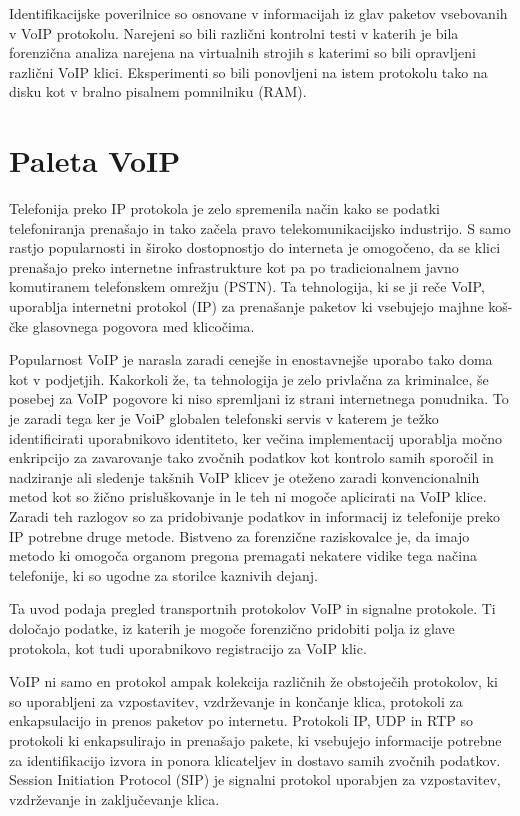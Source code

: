 \documentclass{acm_proc_article-sp}
\begin{document}
Identifikacijske poverilnice so osnovane v informacijah iz glav paketov vsebovanih v VoIP protokolu. Narejeni so bili različni kontrolni testi v katerih je bila forenzična analiza narejena na virtualnih strojih s katerimi so bili opravljeni različni VoIP klici. Eksperimenti so bili ponovljeni na istem protokolu tako na disku kot v bralno pisalnem pomnilniku (RAM).

\section{Paleta VoIP}
Telefonija preko IP protokola je zelo spremenila način kako se podatki telefoniranja prenašajo in tako začela pravo telekomunikacijsko industrijo. S samo rastjo popularnosti in široko dostopnostjo do interneta je omogočeno, da se klici prenašajo preko internetne infrastrukture kot pa po tradicionalnem javno komutiranem telefonskem omrežju (PSTN). Ta tehnologija, ki se ji reče VoIP, uporablja internetni protokol (IP) za prenašanje paketov ki vsebujejo majhne koš-čke glasovnega pogovora med klicočima.

Popularnost VoIP je narasla zaradi cenejše in enostavnejše uporabo tako doma kot v podjetjih\cite{ORIG}. Kakorkoli že, ta tehnologija je zelo privlačna za kriminalce, še posebej za VoIP pogovore ki niso spremljani iz strani internetnega ponudnika. To je zaradi tega ker je VoiP globalen telefonski servis v katerem je težko identificirati uporabnikovo identiteto, ker večina implementacij uporablja močno enkripcijo za zavaro\-vanje tako zvočnih podatkov kot kontrolo samih sporočil in nadziranje ali sledenje takšnih VoIP klicev je oteženo zaradi konvencionalnih metod kot so žično prisluškovanje in le teh ni mogoče aplicirati na VoIP klice. Zaradi teh razlogov so za pridobivanje podatkov in informacij iz telefonije preko IP potrebne druge metode. Bistveno za forenzične raziskovalce je, da imajo metodo ki omogoča organom pregona premagati nekatere vidike tega načina telefonije, ki so ugodne za storilce kaznivih dejanj.

Ta uvod podaja pregled transportnih protokolov VoIP in signalne protokole. Ti določajo podatke, iz katerih je mogoče forenzično pridobiti polja iz glave protokola, kot tudi uporabnikovo registracijo za VoIP klic.

VoIP ni samo en protokol ampak kolekcija različnih že obstoječih protokolov, ki so uporabljeni za vzpostavitev, vzdrževanje in končanje klica, protokoli za enkapsulacijo in prenos paketov po internetu.
Protokoli IP, UDP in RTP so protokoli ki enkapsulirajo in prenašajo pakete, ki vsebujejo informacije potrebne za identifikacijo izvora in ponora klicateljev in dostavo samih zvočnih podatkov. Session Initiation Protocol (SIP) je signalni protokol uporabjen za vzpostavitev, vzdrževanje in zaključevanje klica.
\end{document}

